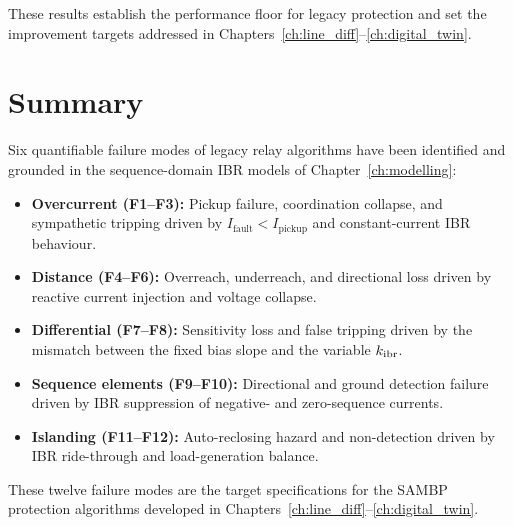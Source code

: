 These results establish the performance floor for legacy protection and
set the improvement targets addressed in
Chapters~\ref{ch:line_diff}--\ref{ch:digital_twin}.

\section{Summary}
\label{sec:ch3_summary}

Six quantifiable failure modes of legacy relay algorithms have been identified
and grounded in the sequence-domain IBR models of Chapter~\ref{ch:modelling}:
\begin{itemize}
\item \textbf{Overcurrent (F1--F3):} Pickup failure, coordination collapse,
      and sympathetic tripping driven by $I_\mathrm{fault} < I_\mathrm{pickup}$
      and constant-current IBR behaviour.
\item \textbf{Distance (F4--F6):} Overreach, underreach, and directional
      loss driven by reactive current injection and voltage collapse.
\item \textbf{Differential (F7--F8):} Sensitivity loss and false tripping
      driven by the mismatch between the fixed bias slope and the variable
      $k_{\mathrm{ibr}}$.
\item \textbf{Sequence elements (F9--F10):} Directional and ground detection
      failure driven by IBR suppression of negative- and zero-sequence currents.
\item \textbf{Islanding (F11--F12):} Auto-reclosing hazard and non-detection
      driven by IBR ride-through and load-generation balance.
\end{itemize}
These twelve failure modes are the target specifications for the SAMBP
protection algorithms developed in Chapters~\ref{ch:line_diff}--\ref{ch:digital_twin}.
